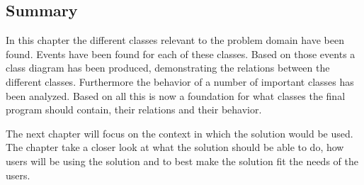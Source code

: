 \subsection{Summary}

In this chapter the different classes relevant to the problem domain have been found. Events have been found for each of these classes. 
Based on those events a class diagram has been produced, demonstrating the relations between the different classes. Furthermore the behavior of a number of important classes has been analyzed. Based on all this is now a foundation for what classes the final program should contain, their relations and their behavior.

The next chapter will focus on the context in which the solution would be used. The chapter take a closer look at what the solution should be able to do, how users will be using the solution and to best make the solution fit the needs of the users.